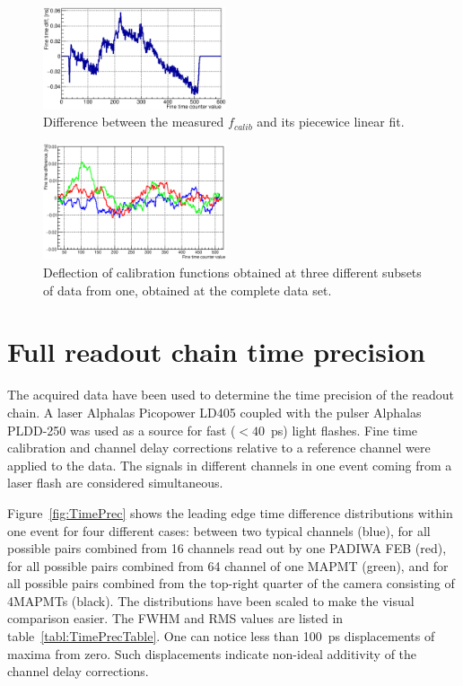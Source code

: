 \documentclass[final,5p,times,twocolumn]{elsarticle}
\begin{document}
\begin{figure}[tbh]
	\centering
	\includegraphics[width=0.48\textwidth]{figures/CalTableMinusFit_0010_01_feb2017.eps}
	\caption{Difference between the measured $ f_{calib} $ and its piecewice linear fit.}
	\label{fig:CalibTableMinusLinear}
\end{figure}

\begin{figure}[tbh]
	\centering
	\includegraphics[width=0.48\textwidth]{figures/Stability_01_diff.eps}
	\caption{Deflection of calibration functions obtained at three different subsets of data from one, obtained at the complete data set.}
	\label{fig:CalibStability}
\end{figure}

\section{Full readout chain time precision}

The acquired data have been used to determine the time precision of the readout chain. A laser Alphalas Picopower LD405 coupled with the pulser Alphalas PLDD-250 \cite{LASER} was used as a source for fast ($<40$~ps) light flashes. Fine time calibration and channel delay corrections relative to a reference channel were applied to the data. The signals in different channels in one event coming from a laser flash are considered simultaneous.

Figure~\ref{fig:TimePrec} shows the leading edge time difference distributions within one event for four different cases:
between two typical channels (blue), for all possible pairs combined from 16 channels read out by one PADIWA FEB (red), for all possible pairs combined from 64 channel of one MAPMT (green), and  for all possible pairs combined from the top-right quarter of the camera consisting of 4MAPMTs (black).
The distributions have been scaled to make the visual comparison easier. The FWHM and RMS values are listed in table~\ref{tabl:TimePrecTable}.
One can notice less than 100~ps displacements of maxima from zero. Such displacements indicate non-ideal additivity of the channel delay corrections.
\end{document}
